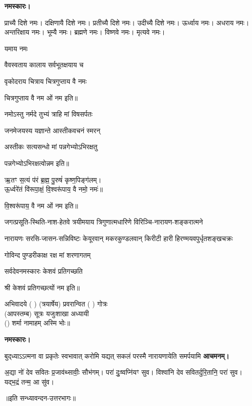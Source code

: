 \textbf{नमस्कारः।}


प्राच्यै दिशे नमः।   
दक्षिणायै दिशे नमः।  
प्रतीच्यै दिशे नमः।   
उदीच्यै दिशे नमः।   
ऊर्ध्वाय नमः।   
अधराय नमः।   
अन्तरिक्षाय नमः। 
भूम्यै नमः। 
ब्रह्मणे नमः। 
विष्णवे नमः।  
मृत्यवे नमः।

यमाय नमः   

{वैवस्वताय   कालाय   सर्वभूतक्षयाय   च}

{वृकोदराय   चित्राय   चित्रगुप्ताय   वै  नमः}

चित्रगुप्ताय   वै  नम ओं नम इति॥

 
{नमोऽस्तु नर्मदे तुभ्यं त्राहि मां विषसर्पतः}

{जनमेजयस्य यज्ञान्ते आस्तीकवचनं स्मरन्}


{अस्तीकः सत्यसन्धो मां पन्नगेभ्योऽभिरक्षतु}

पन्नगेभ्योऽभिरक्षत्वोन्नम इति॥

 

ऋ॒तꣳ स॒त्यं प॑रं ब्र॒ह्म॒ पु॒रुषं॑ कृष्ण॒पिङ्ग॑लम्।\\
ऊ॒र्ध्वरे॑तं वि॑रूपा॒क्षं॒ वि॒श्वरू॑पाय॒ वै नमो॒ नमः॑॥


वि॒श्वरू॑पाय॒ वै नम ओं नम इति॥


{जगत्प्रसूति-स्थिति-नाश-हेतवे}
{त्रयीमयाय त्रिगुणात्मधारिणे}
{विरिञ्चि-नारायण-शङ्करात्मने}

{नारायणः सरसि-जासन-सन्निविष्टः}
{केयूरवान् मकरकुण्डलवान् किरीटी}
{हारी हिरण्मयवपुर्धृतशङ्खचक्रः}

{गोविन्द पुण्डरीकाक्ष रक्ष मां शरणागतम्}

{सर्वदेवनमस्कारः केशवं प्रतिगच्छति}

श्री केशवं प्रतिगच्छत्यों नम इति॥

अभिवादये ( ) (त्रयार्षेय) प्रवरान्वित ( ) गोत्रः\\
(आपस्तम्ब) सूत्रः यजुःशाखा अध्यायी\\
() शर्मा नामाहम् अस्मि भोः॥

\textbf{नमस्कारः।}


{बुद्‌ध्याऽऽत्मना वा प्रकृतेः स्वभावात्}
{करोमि यद्यत् सकलं परस्मै}
{नारायणायेति समर्पयामि}
\textbf{आचमनम्।}

अ॒द्या नो॑ देव सवितः प्र॒जाव॑थ्सावीः॒ सौभ॑गम्। 
परा॑ दुः॒ष्वप्नि॑यꣳ सुव। 
विश्वा॑नि देव सवितर्दुरि॒तानि॒ परा॑ सुव। 
यद्भ॒द्रं तन्म॒ आ सु॑व।

\centerline{॥इति सन्ध्यावन्दन-उत्तरभागः॥}
